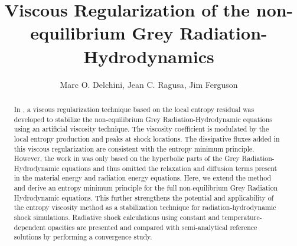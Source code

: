 \documentclass[times,doublespace]{fldauth}%
\begin{document}
%


\title{Viscous Regularization of the non-equilibrium Grey Radiation-Hydrodynamics}

\author{Marc O. Delchini, Jean C. Ragusa\corrauth{}, Jim Ferguson}

\address{
{Department of Nuclear Engineering, Texas A\&M University, College Station, TX 77843, USA} \\
{Los Alamos National Laboratory, Los Alamos, NM 87545, USA}
}


\begin{abstract}
In \cite{our_jcp_radhy_paper}, a viscous regularization technique based on the local entropy residual was
developed to stabilize the non-equilibrium Grey Radiation-Hydrodynamic equations using an artificial viscosity technique. 
The viscosity coefficient is modulated by the local entropy production and peaks at shock locations. 
The dissipative fluxes added in this viscous regularization are consistent with the entropy minimum principle. 
However, the work in \cite{our_jcp_radhy_paper} was only based on the hyperbolic parts
of the Grey Radiation-Hydrodynamic equations and thus omitted the relaxation and diffusion terms 
present in the material energy and radiation energy equations. 
%
Here, we extend the method and derive an entropy minimum principle for the full non-equilibrium Grey Radiation Hydrodynamic 
equations. This further strengthens the potential and applicability of the entropy viscosity method as a stabilization technique 
for radiation-hydrodynamic shock simulations.
Radiative shock calculations using constant and temperature-dependent opacities are presented and 
compared with semi-analytical reference solutions by performing a convergence study. 
\end{abstract}
\end{document}
